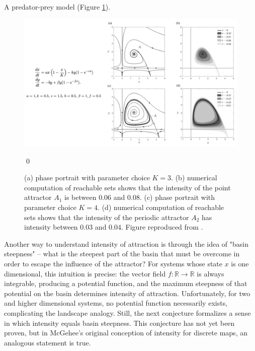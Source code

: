 \begin{example}
A predator-prey model (Figure \ref{fig:predator_prey_reachable_sets}). 

\begin{figure}[H]
\centering
\captionsetup{width=0.9\linewidth}
\includegraphics[width=\textwidth]{figs/predator_prey_reachable_sets} 
\caption{
	(a) phase portrait with parameter choice $K = 3$. (b) numerical computation of reachable sets shows that the intensity of the point attractor $A_1$ is between $0.06$ and $0.08$. (c) phase portrait with parameter choice $K=4$. (d) numerical computation of reachable sets shows that the intensity of the periodic attractor $A_2$ has intensity between $0.03$ and $0.04$. Figure reproduced from \cite{meyerMetricPropertiesAttractors2019}.}\qed
\label{fig:predator_prey_reachable_sets}
\end{figure}
\end{example}

Another way to understand intensity of attraction is through the idea of "basin steepness" -- what is the steepest part of the basin that must be overcome in order to escape the influence of the attractor? For systems whose state $x$ is one dimensional, this intuition is precise: the vector field $f: \mathbb{R} \to \mathbb{R}$ is always integrable, producing a potential function, and the maximum steepness of that potential on the basin determines intensity of attraction.
%
%
%
%
Unfortunately, for two and higher dimensional systems, no potential function necessarily exists, complicating the landscape analogy. Still, the next conjecture formalizes a sense in which intensity equals basin steepness. This conjecture has not yet been proven, but in McGehee's original conception of intensity for discrete maps, an analogous statement is true. %

